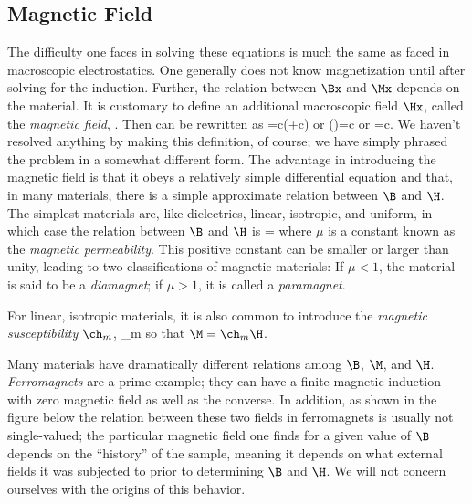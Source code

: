 {\subsection{Magnetic Field}

The difficulty one faces in solving these equations is much the same as
faced in macroscopic electrostatics. One generally does not know
magnetization until after solving for the induction. Further, the relation
between $\Bx$ and $\Mx$ depends on the material. It is customary to define
an additional macroscopic field $\Hx$, called the {\em magnetic field},
\beq
\Hx\equiv{}\pi\Mx.
\eeq
Then  can be rewritten as
\beq
\curl\Bx=\frac{4\pi}c(\Jx+c\curl\Mx)
\eeq
or
\beq
\curl(\pi\Mx)=\frac{4\pi}c\Jx
\eeq
or
\beq
\curl\Hx=\frac{4\pi}c\Jx.
\eeq
We haven't resolved anything by making this definition, of course; we have
simply phrased the problem in a somewhat different form. The advantage in
introducing the magnetic field is that it obeys a relatively simple
differential equation and that, in many materials, there is a simple
approximate relation between $\B$ and $\H$. The simplest materials are,
like dielectrics, linear, isotropic, and uniform, in which case the relation
between $\B$ and $\H$ is
\beq
\Hx=\mu\Bx
\eeq
where $\mu$ is a constant known as the {\em magnetic permeability}. This
positive constant can be smaller or larger than unity, leading to two
classifications of magnetic materials: If $\mu<1$, the material is said to
be a {\em diamagnet}; if $\mu>1$, it is called a {\em paramagnet}. 

\centerline{}

\noindent For
linear, isotropic materials, it is also common to introduce the
{\em magnetic susceptibility} $\ch_m$,
\beq
\ch_m\equiv{}
\eeq
so that $\M=\ch_m\H$.

Many materials have dramatically different relations among $\B$, $\M$, and
$\H$. {\em Ferromagnets} are a prime example; they can have a finite
magnetic induction with zero magnetic field as well as the converse. In
addition, as shown in the figure below
the relation between these two fields in ferromagnets is usually not
single-valued; the particular magnetic field one finds for a given value of
$\B$ depends on the ``history'' of the sample, meaning it depends on what
external fields it was subjected to prior to determining $\B$ and $\H$. We
will not concern ourselves with the origins of this behavior.

\centerline{}
 
}
